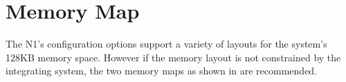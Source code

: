 
\section{Memory Map}
\label{memmap}

The N1's configuration options support a variety of layouts for the system's 128KB
memory space.
However if the memory layout is not constrained by the integrating system, the
two memory maps as shown in  are recommended.

